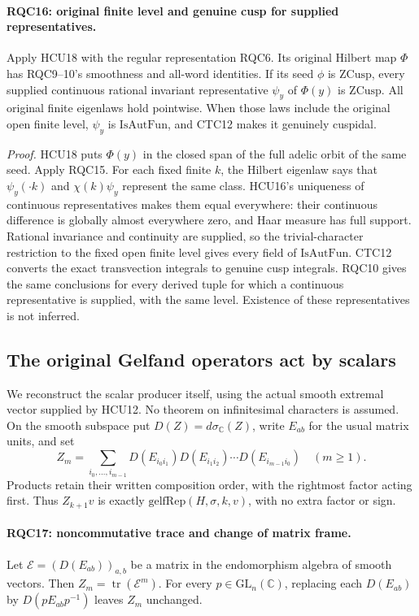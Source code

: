 \paragraph{RQC16: original finite level and genuine cusp for supplied representatives.}
\label{claim:RQC16}
Apply HCU18 with the regular representation RQC6.
Its original Hilbert map \(\Phi\) has RQC9--10's smoothness and
all-word identities.  If its seed \(\phi\) is \(\mathrm{ZCusp}\),
every supplied continuous rational invariant representative
\(\psi_y\) of \(\Phi(y)\) is \(\mathrm{ZCusp}\).
All original finite eigenlaws hold pointwise.  When those laws
include the original open finite level, \(\psi_y\) is
\(\mathrm{IsAutFun}\), and CTC12 makes it genuinely cuspidal.

\emph{Proof.}
HCU18 puts \(\Phi(y)\) in the closed span of the full adelic orbit
of the same seed.  Apply RQC15.  For each fixed finite \(k\), the
Hilbert eigenlaw says that \(\psi_y(\cdot k)\) and
\(\chi(k)\psi_y\) represent the same class.  HCU16's uniqueness of
continuous representatives makes them equal everywhere: their
continuous difference is globally almost everywhere zero, and
Haar measure has full support.  Rational invariance and continuity
are supplied, so the trivial-character restriction to the fixed
open finite level gives every field of \(\mathrm{IsAutFun}\).
CTC12 converts the exact transvection integrals to genuine cusp
integrals.  RQC10 gives the same conclusions for every derived tuple
for which a continuous representative is supplied, with the same
level.  Existence of these representatives is not inferred.

\subsection{The original Gelfand operators act by scalars}

We reconstruct the scalar producer itself, using the actual smooth
extremal vector supplied by HCU12.  No theorem on infinitesimal
characters is assumed.  On the smooth subspace put
\(D(Z)=d\sigma_{\mathbb C}(Z)\), write \(E_{ab}\) for the usual
matrix units, and set
\[
 Z_m=\sum_{i_0,\ldots,i_{m-1}}
 D(E_{i_0i_1})D(E_{i_1i_2})\cdots D(E_{i_{m-1}i_0})
 \quad(m\ge1).
 \tag{RQC.22}
\]
Products retain their written composition order, with the rightmost
factor acting first.  Thus \(Z_{k+1}v\) is exactly
\(\mathrm{gelfRep}(H,\sigma,k,v)\), with no extra factor or sign.

\paragraph{RQC17: noncommutative trace and change of matrix frame.}
\label{claim:RQC17}
Let \(\mathcal E=(D(E_{ab}))_{a,b}\) be a matrix in the
endomorphism algebra of smooth vectors.  Then
\(Z_m=\operatorname{tr}(\mathcal E^m)\).
For every \(p\in\mathrm{GL}_n(\mathbb C)\), replacing each
\(D(E_{ab})\) by \(D(pE_{ab}p^{-1})\) leaves \(Z_m\) unchanged.

